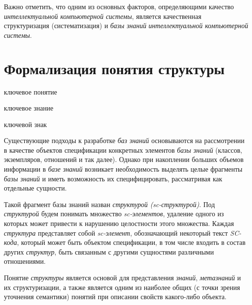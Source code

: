 Важно отметить, что одним из основных факторов, определяющими качество \textit{интеллектуальной компьютерной системы}, является качественная структуризация (систематизация) и  \textit{базы знаний} \textit{интеллектуальной компьютерной системы}.


\section{Формализация понятия структуры}
\label{sec_structure}

\begin{SCn}
	\begin{scnrelfromlist}{ключевое понятие}
	\end{scnrelfromlist}
\end{SCn}

\begin{SCn}
	\begin{scnrelfromlist}{ключевое знание}
	\end{scnrelfromlist}
\end{SCn}

\begin{SCn}
	\begin{scnrelfromlist}{ключевой знак}
	\end{scnrelfromlist}
\end{SCn}

Существующие подходы к разработке \textit{баз знаний} основываются на рассмотрении в качестве объектов спецификации конкретных элементов \textit{базы знаний} (классов, экземпляров, отношений и так далее). Однако при накоплении больших объемов информации в \textit{базе знаний} возникает необходимость выделять целые фрагменты \textit{базы знаний} и иметь возможность их специфицировать, рассматривая как отдельные сущности. 

Такой фрагмент базы знаний назван \textit{структурой (sc-структурой)}. Под \textit{структурой} будем понимать множество \textit{sc-элементов}, удаление одного из которых может привести к нарушению целостности этого множества. Каждая \textit{структура} представляет собой \textit{sc-элемент}, обозначающий некоторый текст \textit{SC-кода}, который может быть объектом спецификации, в том числе входить в состав других \textit{структур}, быть связанным с другими сущностями различными отношениями. 

Понятие \textit{структуры} является основой для представления \textit{знаний}, \textit{метазнаний} и их структуризации, а также является одним из наиболее общих (с точки зрения уточнения семантики) понятий при описании свойств какого-либо объекта. 

